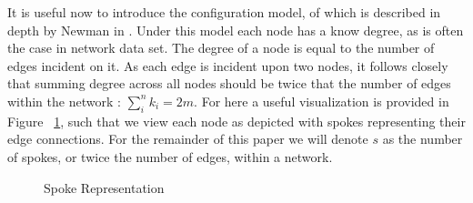 \documentclass[a4paper, 12pt, twocolumn]{article}
\begin{document}
It is useful now to introduce the configuration model, of which is described in depth by Newman in \cite{networks}. 
Under this model each node has a know degree, as is often the case in network data set. 
The degree of a node is equal to the number of edges incident on it. 
As each edge is incident upon two nodes, it follows closely that summing degree across all nodes should be twice that the number of edges within the network : $ \sum_{i}^{n} k_{i} = 2m $.
For here a useful visualization is provided in Figure ~\ref{fig:spokes}, such that we view each node as depicted with spokes representing their edge connections. 
For the remainder of this paper we will denote $ s $ as the number of spokes, or twice the number of edges, within a network. 

\vspace{10mm}

\begin{figure}[h]
       \centering
       \caption{Spoke Representation}
       \label{fig:spokes}
\end{figure}    
\end{document}

